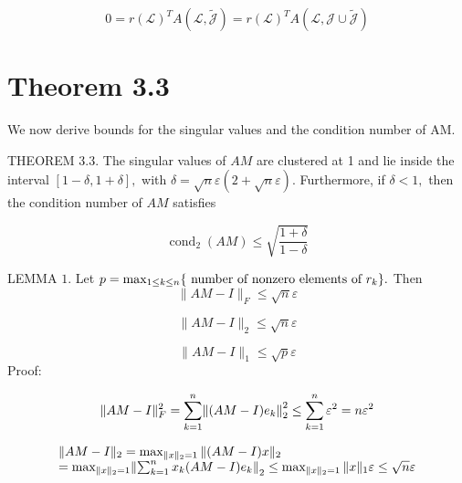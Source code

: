 \documentclass[paper=A4, fontsize=11pt]{scrartcl}
\let\originalleft\left
\let\originalright\right
\renewcommand{\left}{\mathopen{}\mathclose\bgroup\originalleft}
\renewcommand{\right}{\aftergroup\egroup\originalright}
\begin{document}
\begin{equation}
0=r(\mathcal{L})^{T} A(\mathcal{L}, \tilde{\mathcal{J}})=r(\mathcal{L})^{T} A(\mathcal{L}, \mathcal{J} \cup \tilde{\mathcal{J}})
\end{equation}

\newpage

\section{Theorem 3.3}

We now derive bounds for the singular values and the condition number of AM.

THEOREM 3.3. The singular values of \(A M\) are clustered at 1 and lie inside the
interval \([1-\delta, 1+\delta],\) with \(\delta=\sqrt{n} \varepsilon(2+\sqrt{n} \varepsilon) .\) Furthermore, if \(\delta<1,\) then the
condition number of \(A M\) satisfies

\begin{equation}
\operatorname{cond}_{2}(A M) \leq \sqrt{\frac{1+\delta}{1-\delta}}
\end{equation}


LEMMA \(1.\) Let \(p=\max _{1 \leq k \leq n}\left\{\text { number of nonzero elements of } r_{k}\right\} .\) Then
\begin{equation}
\|A M-I\|_{F} \leq \sqrt{n} \varepsilon
\end{equation}

\begin{equation}
\|A M-I\|_{2} \leq \sqrt{n} \varepsilon
\end{equation}

\begin{equation}
\|A M-I\|_{1} \leq \sqrt{p} \varepsilon
\end{equation}
Proof:

\begin{equation}
\|A M-I\|_{F}^{2}=\sum_{k=1}^{n}\left\|(A M-I) e_{k}\right\|_{2}^{2} \leq \sum_{k=1}^{n} \varepsilon^{2}=n \varepsilon^{2}
\end{equation}

\begin{equation}
\begin{array}{l}{\|A M-I\|_{2}=\max _{\|x\|_{2}=1}\|(A M-I) x\|_{2}} \\ {=\max _{\|x\|_{2}=1}\left\|\sum_{k=1}^{n} x_{k}(A M-I) e_{k}\right\|_{2} \leq \max _{\|x\|_{2}=1}\|x\|_{1} \varepsilon \leq \sqrt{n} \varepsilon}\end{array}
\end{equation}
\end{document}
